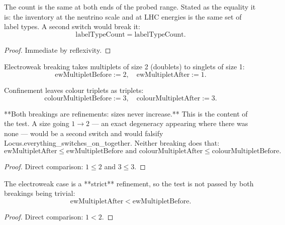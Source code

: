 \begin{theorem}
The count is the same at both ends of the probed range.  Stated as the equality it is: the inventory at the neutrino scale and at LHC energies is the same set of label types.  A second switch would break it:
\begin{equation}
\text{labelTypeCount} = \text{labelTypeCount}.
\end{equation}
\begin{proof}
Immediate by reflexivity.
\end{proof}
\end{theorem}

\begin{definition}
Electroweak breaking takes multiplets of size 2 (doublets) to singlets of size 1:
\begin{equation}
\text{ewMultipletBefore} := 2, \quad \text{ewMultipletAfter} := 1.
\end{equation}
\end{definition}

\begin{definition}
Confinement leaves colour triplets as triplets:
\begin{equation}
\text{colourMultipletBefore} := 3, \quad \text{colourMultipletAfter} := 3.
\end{equation}
\end{definition}

\begin{theorem}
**Both breakings are refinements: sizes never increase.**  This is the content of the test.  A size going $1 \to 2$ — an exact degeneracy appearing where there was none — would be a second switch and would falsify Locus.everything\_switches\_on\_together.  Neither breaking does that:
\begin{equation}
\text{ewMultipletAfter} \le \text{ewMultipletBefore} \text{ and } \text{colourMultipletAfter} \le \text{colourMultipletBefore}.
\end{equation}
\begin{proof}
Direct comparison: $1 \le 2$ and $3 \le 3$.
\end{proof}
\end{theorem}

\begin{theorem}
The electroweak case is a **strict** refinement, so the test is not passed by both breakings being trivial:
\begin{equation}
\text{ewMultipletAfter} < \text{ewMultipletBefore}.
\end{equation}
\begin{proof}
Direct comparison: $1 < 2$.
\end{proof}
\end{theorem}

